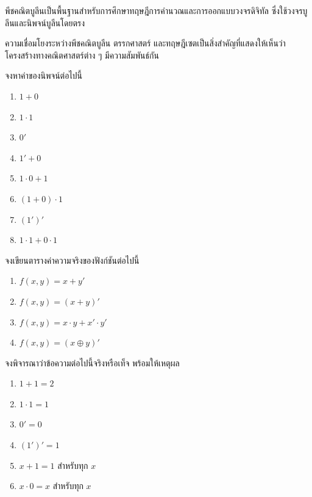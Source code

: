 พีชคณิตบูลีนเป็นพื้นฐานสำหรับการศึกษาทฤษฎีการคำนวณและการออกแบบวงจรดิจิทัล ซึ่งใช้วงจรบูลีนและนิพจน์บูลีนโดยตรง

ความเชื่อมโยงระหว่างพีชคณิตบูลีน ตรรกศาสตร์ และทฤษฎีเซตเป็นสิ่งสำคัญที่แสดงให้เห็นว่าโครงสร้างทางคณิตศาสตร์ต่าง ๆ มีความสัมพันธ์กัน~\parencite{rosen2019discrete}

\clearpage
{}
\label{sec:exercises-boolean}

\begin{exercise}
จงหาค่าของนิพจน์ต่อไปนี้
\begin{enumerate}
    \item $1 + 0$
    \item $1 \cdot 1$
    \item $0'$
    \item $1' + 0$
    \item $1 \cdot 0 + 1$
    \item $(1 + 0) \cdot 1$
    \item $(1')'$
    \item $1 \cdot 1 + 0 \cdot 1$
\end{enumerate}
\end{exercise}

\begin{exercise}
จงเขียนตารางค่าความจริงของฟังก์ชันต่อไปนี้
\begin{enumerate}
    \item $f(x, y) = x + y'$
    \item $f(x, y) = (x + y)'$
    \item $f(x, y) = x \cdot y + x' \cdot y'$
    \item $f(x, y) = (x \oplus y)'$
\end{enumerate}
\end{exercise}

\begin{exercise}
จงพิจารณาว่าข้อความต่อไปนี้จริงหรือเท็จ พร้อมให้เหตุผล
\begin{enumerate}
    \item $1 + 1 = 2$
    \item $1 \cdot 1 = 1$
    \item $0' = 0$
    \item $(1')' = 1$
    \item $x + 1 = 1$ สำหรับทุก $x$
    \item $x \cdot 0 = x$ สำหรับทุก $x$
\end{enumerate}
\end{exercise}

